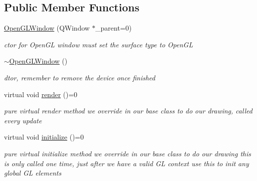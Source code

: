\subsection*{Public Member Functions}
\begin{DoxyCompactItemize}
\item 
\hyperlink{classOpenGLWindow_a2fd92afd17361a60e058dc5433c316af}{Open\-G\-L\-Window} (Q\-Window $\ast$\-\_\-parent=0)
\begin{DoxyCompactList}\small\item\em ctor for Open\-G\-L window must set the surface type to Open\-G\-L \end{DoxyCompactList}\item 
\hypertarget{classOpenGLWindow_aa220b192c71871aab9100f4058a8d62d}{\hyperlink{classOpenGLWindow_aa220b192c71871aab9100f4058a8d62d}{$\sim$\-Open\-G\-L\-Window} ()}\label{classOpenGLWindow_aa220b192c71871aab9100f4058a8d62d}

\begin{DoxyCompactList}\small\item\em dtor, remember to remove the device once finished \end{DoxyCompactList}\item 
\hypertarget{classOpenGLWindow_a0e0194a4f0a30af7249819094c7d1d35}{virtual void \hyperlink{classOpenGLWindow_a0e0194a4f0a30af7249819094c7d1d35}{render} ()=0}\label{classOpenGLWindow_a0e0194a4f0a30af7249819094c7d1d35}

\begin{DoxyCompactList}\small\item\em pure virtual render method we override in our base class to do our drawing, called every update \end{DoxyCompactList}\item 
\hypertarget{classOpenGLWindow_a00b6a24198503b88aea4c5a995723db2}{virtual void \hyperlink{classOpenGLWindow_a00b6a24198503b88aea4c5a995723db2}{initialize} ()=0}\label{classOpenGLWindow_a00b6a24198503b88aea4c5a995723db2}

\begin{DoxyCompactList}\small\item\em pure virtual initialize method we override in our base class to do our drawing this is only called one time, just after we have a valid G\-L context use this to init any global G\-L elements \end{DoxyCompactList}\end{DoxyCompactItemize}
